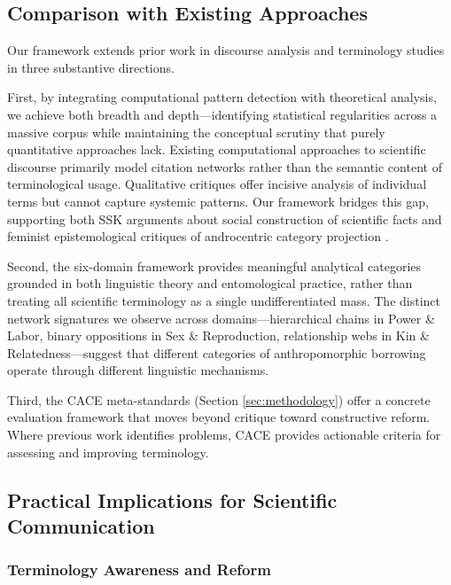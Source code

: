\documentclass[
]{article}
\numberwithin{equation}{section}
\begin{document}
\subsection{Comparison with Existing
Approaches}\label{comparison-with-existing-approaches}

Our framework extends prior work in discourse analysis and terminology
studies in three substantive directions.

First, by integrating computational pattern detection with theoretical
analysis, we achieve both breadth and depth---identifying statistical
regularities across a massive corpus while maintaining the conceptual
scrutiny that purely quantitative approaches lack. Existing
computational approaches to scientific discourse
\cite{chen2006citespace} primarily model citation networks rather than
the semantic content of terminological usage. Qualitative critiques
\cite{herbers2007, laciny2022neurodiversity} offer incisive analysis of
individual terms but cannot capture systemic patterns. Our framework
bridges this gap, supporting both SSK arguments about social
construction of scientific facts \cite{latour1987} and feminist
epistemological critiques of androcentric category projection
\cite{haraway1991}.

Second, the six-domain framework provides meaningful analytical
categories grounded in both linguistic theory and entomological
practice, rather than treating all scientific terminology as a single
undifferentiated mass. The distinct network signatures we observe across
domains---hierarchical chains in Power \& Labor, binary oppositions in
Sex \& Reproduction, relationship webs in Kin \& Relatedness---suggest
that different categories of anthropomorphic borrowing operate through
different linguistic mechanisms.

Third, the CACE meta-standards (Section \ref{sec:methodology}) offer a
concrete evaluation framework that moves beyond critique toward
constructive reform. Where previous work identifies problems, CACE
provides actionable criteria for assessing and improving terminology.

\subsection{Practical Implications for Scientific
Communication}\label{practical-implications-for-scientific-communication}

\subsubsection{Terminology Awareness and
Reform}\label{terminology-awareness-and-reform}
\end{document}
